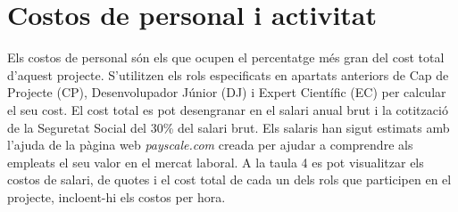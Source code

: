 \section{Costos de personal i activitat}
Els costos de personal són els que ocupen el percentatge més gran del cost total d'aquest projecte. S'utilitzen els rols especificats en apartats anteriors de Cap de Projecte (CP), Desenvolupador Júnior (DJ) i Expert Científic (EC) per calcular el seu cost. El cost total es pot desengranar en el salari anual brut i la cotització de la Seguretat Social del 30\% del salari brut. Els salaris han sigut estimats amb l'ajuda de la pàgina web \textit{payscale.com} creada per ajudar a comprendre als empleats el seu valor en el mercat laboral. A la taula 4 es pot visualitzar els costos de salari, de quotes i el cost total de cada un dels rols que participen en el projecte, incloent-hi els costos per hora.


